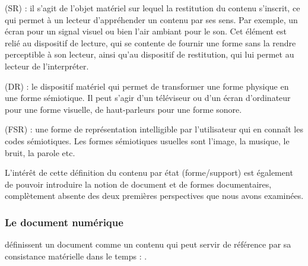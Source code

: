 \begin{listeni}
\begin{liste}
		\item {} (SR) : il s'agit de l'objet matériel sur lequel la restitution du contenu s'inscrit, ce qui permet à un lecteur d'appréhender un contenu par ses sens. 
		Par exemple, un écran pour un signal visuel ou bien l'air ambiant pour le son.
		Cet élément est relié au dispositif de lecture, qui se contente de fournir une forme sans la rendre perceptible à son lecteur, ainsi qu'au dispositif de restitution, qui lui permet au lecteur de l'interpréter.
		
		\item {} (DR) : le dispositif matériel qui permet de transformer une forme physique en une forme sémiotique.
		Il peut s'agir d'un téléviseur ou d'un écran d'ordinateur pour une forme visuelle, de haut-parleurs pour une forme sonore.
		
		\item {} (FSR) : une forme de représentation intelligible par l'utilisateur qui en connaît les codes sémiotiques.
		Les formes sémiotiques usuelles sont l'image, la musique, le bruit, la parole etc.
	\end{liste}
\end{listeni}

L'intérêt de cette définition du contenu par état (forme/support) est également de pouvoir introduire la notion de document et de formes documentaires, complètement absente des deux premières perspectives que nous avons examinées.


\subsubsection{Le document numérique}
\cite{Morizet-mahoudeaux2005a} définissent un document comme un contenu qui peut servir de référence par sa consistance matérielle dans le temps : .

